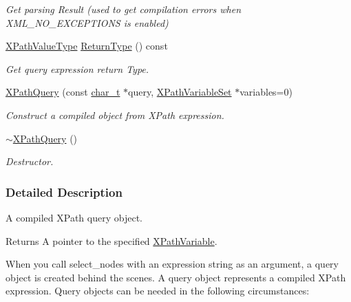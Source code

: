 \begin{DoxyCompactItemize}
\begin{DoxyCompactList}\small\item\em Get parsing Result (used to get compilation errors when XML\_\-NO\_\-EXCEPTIONS is enabled) \item\end{DoxyCompactList}\item 
\hyperlink{namespacephys_1_1xml_a339b9eef674ba44100110e5524bc575d}{XPathValueType} \hyperlink{classphys_1_1xml_1_1XPathQuery_af4c6025009b1e09cdf56124a047ca4f0}{ReturnType} () const 
\begin{DoxyCompactList}\small\item\em Get query expression return Type. \item\end{DoxyCompactList}\item 
\hyperlink{classphys_1_1xml_1_1XPathQuery_a1a63135370ef4999f3dd27540c9009a2}{XPathQuery} (const \hyperlink{namespacephys_1_1xml_afc87705cd1c2917d87b879715a2d8f6e}{char\_\-t} $\ast$query, \hyperlink{classphys_1_1xml_1_1XPathVariableSet}{XPathVariableSet} $\ast$variables=0)
\begin{DoxyCompactList}\small\item\em Construct a compiled object from XPath expression. \item\end{DoxyCompactList}\item 
\hypertarget{classphys_1_1xml_1_1XPathQuery_a063a1c4513d62695ae73c981f2050dc4}{
\hyperlink{classphys_1_1xml_1_1XPathQuery_a063a1c4513d62695ae73c981f2050dc4}{$\sim$XPathQuery} ()}
\label{classphys_1_1xml_1_1XPathQuery_a063a1c4513d62695ae73c981f2050dc4}

\begin{DoxyCompactList}\small\item\em Destructor. \item\end{DoxyCompactList}\end{DoxyCompactItemize}


\subsubsection{Detailed Description}
A compiled XPath query object. \begin{DoxyReturn}{Returns}
A pointer to the specified \hyperlink{classphys_1_1xml_1_1XPathVariable}{XPathVariable}.
\end{DoxyReturn}
When you call select\_\-nodes with an expression string as an argument, a query object is created behind the scenes. A query object represents a compiled XPath expression. Query objects can be needed in the following circumstances: \par

